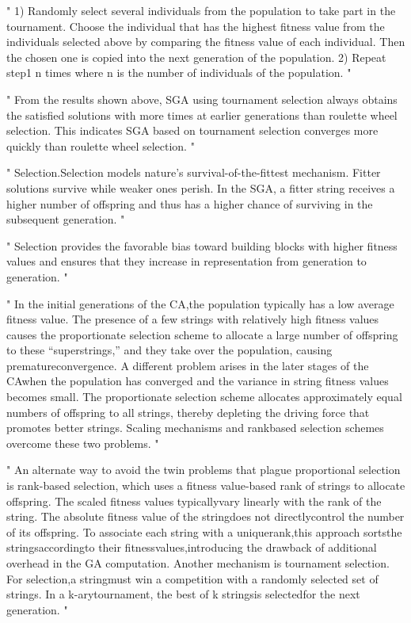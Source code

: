 "
1) Randomly select several individuals from the population to take part in the tournament. Choose the individual that has the highest fitness value from the individuals selected above by comparing the fitness value of each individual. Then the chosen one is copied into the next generation of the population. 2) Repeat step1 n times where n is the number of individuals of the population.
"\cite{jinghui_zhong_comparison_2005}

"
From the results shown above, SGA using tournament selection always obtains the satisfied solutions with more times at earlier generations than roulette wheel selection. This indicates SGA based on tournament selection converges more quickly than roulette wheel selection.
"\cite{jinghui_zhong_comparison_2005}

"
Selection.Selection models nature's survival-of-the-fittest mechanism. Fitter solutions survive while weaker ones perish. In the SGA, a fitter string receives a higher number of offspring and thus has a higher chance of surviving in the subsequent generation.
"\cite{srinivas_genetic_1994}

"
Selection provides the favorable bias toward building blocks with higher fitness values and ensures that they increase in representation from generation to generation.
"\cite{srinivas_genetic_1994}


"
In the initial generations of the CA,the population typically has a low average fitness value. The presence of a few strings with relatively high fitness values causes the proportionate selection scheme to allocate a large number of offspring to these “superstrings,” and they take over the population, causing prematureconvergence. A different problem arises in the later stages of the CAwhen the population has converged and the variance in string fitness values becomes small. The proportionate selection scheme allocates approximately equal numbers of offspring to all strings, thereby depleting the driving force that promotes better strings. Scaling mechanisms and rankbased selection schemes overcome these two problems.
"\cite{srinivas_genetic_1994}

"
An alternate way to avoid the twin problems that plague proportional selection is rank-based selection, which uses a fitness value-based rank of strings to allocate offspring. The scaled fitness values typicallyvary linearly with the rank of the string. The absolute fitness value of the stringdoes not directlycontrol the number of its offspring. To associate each string with a uniquerank,this approach sortsthe stringsaccordingto their fitnessvalues,introducing the drawback of additional overhead in the GA computation. Another mechanism is tournament selection. For selection,a stringmust win a competition with a randomly selected set of strings. In a k-arytournament, the best of k stringsis selectedfor the next generation.
"\cite{srinivas_genetic_1994}

